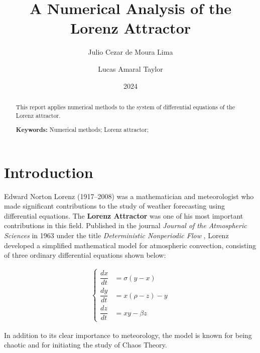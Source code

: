 \documentclass[12pt, a4paper]{article}
\title{A Numerical Analysis of the Lorenz Attractor}
\author{Julio Cezar de Moura Lima \and Lucas Amaral Taylor}
\date{2024}
\begin{document}
\maketitle


\begin{abstract}
	\begin{center}
		This report applies numerical methods to the system of differential equations of the Lorenz attractor.
		
		\vspace{0.25cm}
		
		\noindent \textbf{Keywords:} Numerical methods; Lorenz attractor;
	\end{center}
\end{abstract}


    
    
\section{Introduction}\label{introduction}

Edward Norton Lorenz (1917–2008) was a mathematician and meteorologist who made significant contributions to the study of weather forecasting using differential equations. The \textbf{Lorenz Attractor} was one of his most important contributions in this field. Published in the journal \textit{Journal of the Atmospheric Sciences} in 1963 under the title \textit{Deterministic Nonperiodic Flow} \cite{Lorenz1963}, Lorenz developed a simplified mathematical model for atmospheric convection, consisting of three ordinary differential equations shown below:

\begin{align}
	\begin{cases}
	\dfrac{dx}{dt} & = \sigma(y-x)     \\
	\dfrac{dy}{dt} & = x(\rho - z) - y \\
	\dfrac{dz}{dt} & = xy - \beta z    
	\end{cases}
	\label{eq:apresentacao-sistema}
\end{align}

In addition to its clear importance to meteorology, the model is known for being chaotic and for initiating the study of Chaos Theory.
\end{document}
